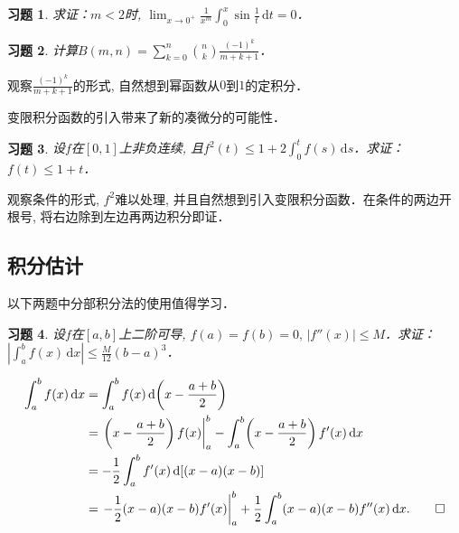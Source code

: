 \documentclass[11pt,a4paper]{ctexart}
\makeatletter
\theoremstyle{thmseries} %
\theoremstyle{exerseries}
\newtheorem{exer}{习题}[section]
\renewenvironment{proof}[1][\proofname]{\par
  \pushQED{\qed}%
  \normalfont \topsep6\p@\@plus6\p@\relax
  \trivlist
  \item[\hskip\labelsep
        \itshape
    #1\@addpunct{}]\ignorespaces
}{%
  \popQED\endtrivlist\@endpefalse
}
\newenvironment{sol}{\begin{proof}[\bfseries\upshape 解\quad]}{\end{proof}}
\newenvironment{pf}{\begin{proof}[\bfseries\upshape 证\quad]}{\end{proof}}
\newcommand{\bra}[1]{\mathopen{}\left(#1\right)}
\renewcommand{\d}{\mathrm{d}}
\makeatother
\begin{document}
\begin{exer}
	求证：$m<2$时, $\lim_{x\to0^+}\frac{1}{x^m}\int_{0}^{x}\sin\frac{1}{t}\,\d t=0$．
\end{exer}

\begin{exer}
	计算$B(m,n)=\sum_{k=0}^{n}\binom{n}{k}\frac{(-1)^k}{m+k+1}$．
\end{exer}
\begin{sol}
	观察$\frac{(-1)^k}{m+k+1}$的形式, 自然想到幂函数从$0$到$1$的定积分．
\end{sol}

变限积分函数的引入带来了新的凑微分的可能性．
\begin{exer}
	设$f$在$[0,1]$上非负连续, 且$f^2(t)\leq1+2\int_{0}^{t}f(s)\,\d s$．求证：$f(t)\leq1+t$．
\end{exer}
\begin{pf}
	观察条件的形式, $f^2$难以处理, 并且自然想到引入变限积分函数．在条件的两边开根号, 将右边除到左边再两边积分即证．
\end{pf}


\subsection{积分估计}
以下两题中分部积分法的使用值得学习．
\begin{exer}
	设$f$在$[a,b]$上二阶可导, $f(a)=f(b)=0,\,|f''(x)|\leq M$．求证：$\left|\int_{a}^{b}f(x)\,\d x\right|\leq\frac{M}{12}(b-a)^3$．	
\end{exer}
\begin{pf}
	\begin{align*}
		\int_{a}^{b}f(x)\,\d x&=\int_{a}^{b}f(x)\,\d\bra{x-\frac{a+b}{2}}\\
		&=\left.\bra{x-\frac{a+b}{2}}f(x)\right|_a^b-\int_{a}^{b}\bra{x-\frac{a+b}{2}}f'(x)\,\d x\\
		&=-\frac{1}{2}\int_{a}^{b}f'(x)\,\d[(x-a)(x-b)]\\
		&=\left.-\frac{1}{2}(x-a)(x-b)f'(x)\right|_a^b+\frac{1}{2}\int_{a}^{b}(x-a)(x-b)f''(x)\,\d x.\qedhere
	\end{align*}
\end{pf}

\end{document}
